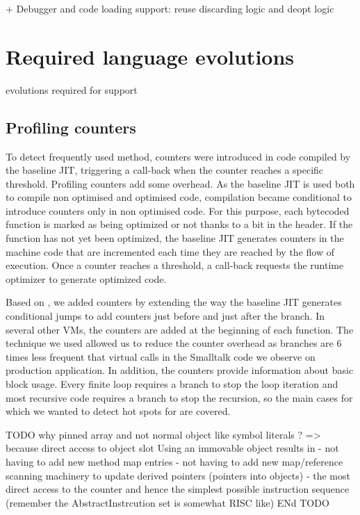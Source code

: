 \documentclass[a4paper,12pt,twoside]{../includes/ThesisStyle}
\begin{document}
+ Debugger and code loading support: reuse discarding logic and deopt logic


\section{Required language evolutions}

evolutions required for support

\subsection{Profiling counters}


To detect frequently used method, counters were introduced in code compiled by the baseline JIT, triggering a call-back when the counter reaches a specific threshold. Profiling counters add some overhead. As the baseline JIT is used both to compile non optimised and optimised code, compilation became conditional to introduce counters only in non optimised code. For this purpose, each bytecoded function is marked as being optimized or not thanks to a bit in the header. If the function has not yet been optimized, the baseline JIT generates counters in the machine code that are incremented each time they are reached by the flow of execution. Once a counter reaches a threshold, a call-back requests the runtime optimizer to generate optimized code.

Based on \cite{Arn02}, we added counters by extending the way the baseline JIT generates conditional jumps to add counters just before and just after the branch. In several other VMs, the counters are added at the beginning of each function. The technique we used allowed us to reduce the counter overhead as branches are 6 times less frequent that virtual calls in the Smalltalk code we observe on production application. In addition, the counters provide information about basic block usage. Every finite loop requires a branch to stop the loop iteration and most recursive code requires a branch to stop the recursion, so the main cases for which we wanted to detect hot spots for are covered.

TODO why pinned array and not normal object like symbol literals ? => because direct access to object slot 
Using an immovable object results in 
- not having to add new method map entries
- not having to add new map/reference scanning machinery to update derived pointers (pointers into objects)
- the most direct access to the counter and hence the simplest possible instruction sequence (remember the AbstractInstrcution set is somewhat RISC like)
ENd TODO
\end{document}

